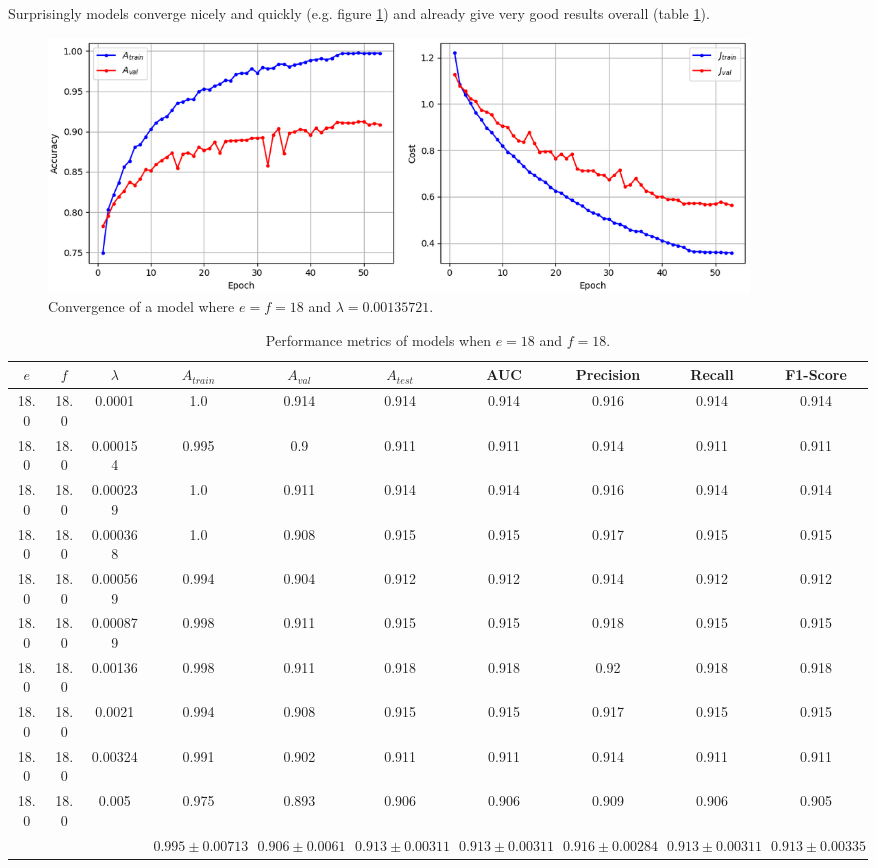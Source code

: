 Surprisingly models converge nicely and quickly (e.g. figure \ref{fig:vgg16_total_convergence}) and already give very good results overall (table \ref{table:vgg16_total}).

\begin{figure}[ht]
    \centering
    \includegraphics[width=0.9\textwidth]{figs/vgg16_total_convergence.png}
    \caption{Convergence of a model where $e = f = 18$ and $\lambda = 0.00135721$.}
    \label{fig:vgg16_total_convergence}
\end{figure}

\begin{table}[ht]
\centering
\begin{tabular}{ |c|c|c|c|c|c|c|c|c|c| }
\hline
$e$ & $f$ & $\lambda$ & $A_{train}$ & $A_{val}$ & $A_{test}$ & AUC & Precision & Recall & F1-Score \\
\hline
18.0 & 18.0 & 0.0001 & 1.0 & 0.914 & 0.914 & 0.914 & 0.916 & 0.914 & 0.914 \\
18.0 & 18.0 & 0.000154 & 0.995 & 0.9 & 0.911 & 0.911 & 0.914 & 0.911 & 0.911 \\
18.0 & 18.0 & 0.000239 & 1.0 & 0.911 & 0.914 & 0.914 & 0.916 & 0.914 & 0.914 \\
18.0 & 18.0 & 0.000368 & 1.0 & 0.908 & 0.915 & 0.915 & 0.917 & 0.915 & 0.915 \\
18.0 & 18.0 & 0.000569 & 0.994 & 0.904 & 0.912 & 0.912 & 0.914 & 0.912 & 0.912 \\
18.0 & 18.0 & 0.000879 & 0.998 & 0.911 & 0.915 & 0.915 & 0.918 & 0.915 & 0.915 \\
18.0 & 18.0 & 0.00136 & 0.998 & 0.911 & 0.918 & 0.918 & 0.92 & 0.918 & 0.918 \\
18.0 & 18.0 & 0.0021 & 0.994 & 0.908 & 0.915 & 0.915 & 0.917 & 0.915 & 0.915 \\
18.0 & 18.0 & 0.00324 & 0.991 & 0.902 & 0.911 & 0.911 & 0.914 & 0.911 & 0.911 \\
18.0 & 18.0 & 0.005 & 0.975 & 0.893 & 0.906 & 0.906 & 0.909 & 0.906 & 0.905 \\
\hline
 & & & $0.995\pm0.00713$ & $0.906\pm0.0061$ & $0.913\pm0.00311$ & $0.913\pm0.00311$ & $0.916\pm0.00284$ & $0.913\pm0.00311$ & $0.913\pm0.00335$ \\
\hline
\end{tabular}
\caption{Performance metrics of models when $e = 18$ and $f = 18$.}
\label{table:vgg16_total}
\end{table}

